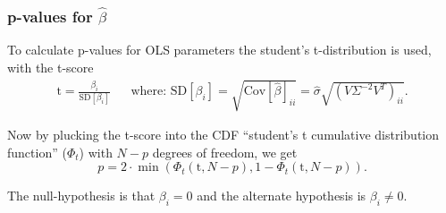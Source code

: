 \subsubsection{p-values for $\hat{\beta}$}

To calculate p-values for OLS parameters the student's t-distribution is used, with the t-score \cite{t-value-ols}
\begin{align}
\mathrm{t} = \frac{\beta_i}{\mathrm{SD}[\beta_i]} && \text{where: } \mathrm{SD}[\beta_i] = \sqrt{\mathrm{Cov}[\hat{\beta}]_{ii}} = \hat{\sigma} \sqrt{ (V \Sigma^{-2} V^T)_{ii} }.
\end{align}

Now by plucking the t-score into the CDF ``student's t cumulative distribution function'' ($\Phi_t$) with $N - p$ degrees of freedom, we get
\begin{equation}
p = 2 \cdot \min( \Phi_t\left(\mathrm{t}, N-p\right), 1 - \Phi_t\left(\mathrm{t}, N-p\right) ).
\end{equation}

The null-hypothesis is that $\beta_i = 0$ and the alternate hypothesis is $\beta_i \not = 0$.
